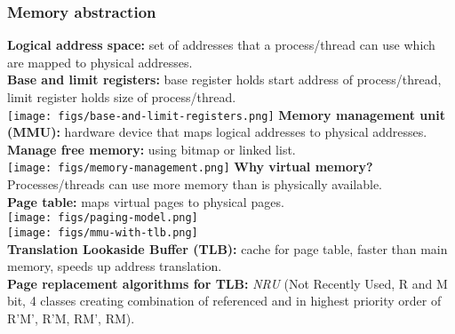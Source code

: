 \subsubsection{Memory abstraction}
\textbf{Logical address space:} set of addresses that a process/thread can use which are mapped to physical addresses.\\
\textbf{Base and limit registers:} base register holds start address of process/thread, limit register holds size of process/thread.\\
\texttt{[image: figs/base-and-limit-registers.png]}
\textbf{Memory management unit (MMU):} hardware device that maps logical addresses to physical addresses.\\
\textbf{Manage free memory:} using bitmap or linked list.\\
\texttt{[image: figs/memory-management.png]}
\textbf{Why virtual memory?} Processes/threads can use more memory than is physically available.\\
\textbf{Page table:} maps virtual pages to physical pages.\\
\texttt{[image: figs/paging-model.png]}\\
\texttt{[image: figs/mmu-with-tlb.png]}\\
\textbf{Translation Lookaside Buffer (TLB):} cache for page table, faster than main memory, speeds up address translation.\\
\textbf{Page replacement algorithms for TLB:} \textit{NRU} (Not Recently Used, R and M bit, 4 classes creating combination of referenced and in highest priority order of R'M', R'M, RM', RM).\\
